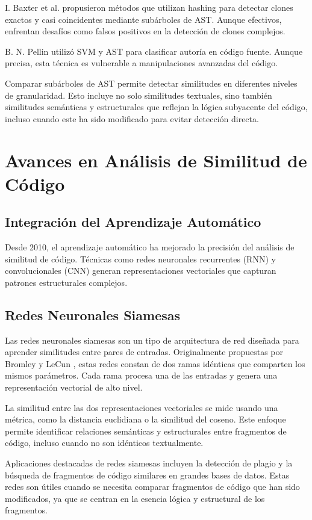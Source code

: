 I. Baxter et al. \cite{baxter1998clone} propusieron métodos que utilizan hashing para detectar clones exactos y casi coincidentes mediante subárboles de AST. Aunque efectivos, enfrentan desafíos como falsos positivos en la detección de clones complejos.

B. N. Pellin \cite{pellin2004authorship} utilizó SVM y AST para clasificar autoría en código fuente. Aunque precisa, esta técnica es vulnerable a manipulaciones avanzadas del código.

Comparar subárboles de AST permite detectar similitudes en diferentes niveles de granularidad. Esto incluye no solo similitudes textuales, sino también similitudes semánticas y estructurales que reflejan la lógica subyacente del código, incluso cuando este ha sido modificado para evitar detección directa.

\section{Avances en Análisis de Similitud de Código}

\subsection{Integración del Aprendizaje Automático}
Desde 2010, el aprendizaje automático ha mejorado la precisión del análisis de similitud de código. Técnicas como redes neuronales recurrentes (RNN) y convolucionales (CNN) generan representaciones vectoriales que capturan patrones estructurales complejos.

\subsection{Redes Neuronales Siamesas}
Las redes neuronales siamesas son un tipo de arquitectura de red diseñada para aprender similitudes entre pares de entradas. Originalmente propuestas por Bromley y LeCun \cite{bromley1993signature}, estas redes constan de dos ramas idénticas que comparten los mismos parámetros. Cada rama procesa una de las entradas y genera una representación vectorial de alto nivel.

La similitud entre las dos representaciones vectoriales se mide usando una métrica, como la distancia euclidiana o la similitud del coseno. Este enfoque permite identificar relaciones semánticas y estructurales entre fragmentos de código, incluso cuando no son idénticos textualmente.

Aplicaciones destacadas de redes siamesas incluyen la detección de plagio y la búsqueda de fragmentos de código similares en grandes bases de datos. Estas redes son útiles cuando se necesita comparar fragmentos de código que han sido modificados, ya que se centran en la esencia lógica y estructural de los fragmentos.

